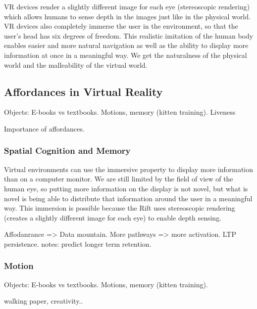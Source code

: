 \documentclass[conference]{IEEEtran}
\begin{document}
VR devices render a slightly different image for each eye (stereoscopic rendering) which allows humans to sense depth in the images just like in the physical world. 
VR devices also completely immerse the user in the environment, so that the user's head has six degrees of freedom. 
This realistic imitation of the human body enables easier and more natural navigation as well as the ability to display more information at once in a meaningful way. 
We get the naturalness of the physical world and the malleability of the virtual world.


\subsection{Affordances in Virtual Reality}

Objects: E-books vs textbooks.
Motions, memory (kitten training).
Liveness

Importance of affordances.


\subsubsection{Spatial Cognition and Memory}


Virtual environments can use the immersive property to display more information than on a computer monitor. 
We are still limited by the field of view of the human eye, so putting more information on the display is not novel, but what is novel is being able to distribute that information around the user in a meaningful way. 
This immersion is possible because the Rift uses stereoscopic rendering (creates a slightly different image for each eye) to enable depth sensing.

Affodanrance =>
Data mountain. More pathways => more activation. LTP persistence. notes: predict longer term retention.


\subsubsection{Motion}

Objects: E-books vs textbooks.
Motions, memory (kitten training).

walking paper, creativity..
\end{document}
